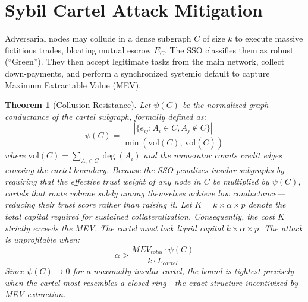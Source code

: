 \documentclass[11pt]{article}
\newtheorem{theorem}{Theorem}[section]
\begin{document}
\section{Sybil Cartel Attack Mitigation}
\label{sec:sybil}

Adversarial nodes may collude in a dense subgraph $C$ of size $k$ to execute massive fictitious trades, bloating mutual escrow $E_C$. The SSO classifies them as robust (``Green''). They then accept legitimate tasks from the main network, collect down-payments, and perform a synchronized systemic default to capture Maximum Extractable Value (MEV).

\begin{theorem}[Collusion Resistance]
\label{thm:collusion}
Let $\psi(C)$ be the normalized graph conductance of the cartel subgraph, formally defined as:
$$\psi(C) = \frac{|\{e_{ij} : A_i \in C, A_j \notin C\}|}{\min(\text{vol}(C),\, \text{vol}(\bar{C}))}$$
where $\text{vol}(C) = \sum_{A_i \in C} \deg(A_i)$ and the numerator counts credit edges crossing the cartel boundary. Because the SSO penalizes insular subgraphs by requiring that the effective trust weight of any node in $C$ be multiplied by $\psi(C)$, cartels that route volume solely among themselves achieve low conductance—reducing their trust score rather than raising it. Let $K = k \times \alpha \times p$ denote the total capital required for sustained collateralization. Consequently, the cost $K$ strictly exceeds the MEV. The cartel must lock liquid capital $k \times \alpha \times p$. The attack is unprofitable when:
$$ \alpha > \frac{MEV_{total} \cdot \psi(C)}{k \cdot L_{cartel}} $$
Since $\psi(C) \to 0$ for a maximally insular cartel, the bound is tightest precisely when the cartel most resembles a closed ring—the exact structure incentivized by MEV extraction.
\end{theorem}
\end{document}
